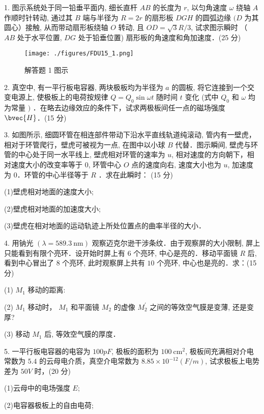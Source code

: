 
1. 图示系统处于同一铅垂平面内, 细长直杆 $A B$ 的长度为 $r$, 以匀角速度 $\omega$ 绕轴 $A$ 作顺时针转动, 通过其 $B$ 端与半径为 $R=2 r$ 的扇形板 $D G H$ 的圆弧边缘 $(D$ 为其圆心）接触, 从而带动扇形板绕轴 $O$ 转动, 且 $O D=\sqrt{3} R / 3$, 试求图示瞬时 （ $A B$ 处于水平位置, $D G$ 处于铅垂位置) 扇形板的角速度和角加速度．(25 分)

\begin{figure}[ht]
\centering
\texttt{[image: ./figures/FDU15\_1.png]}
\caption{解答题 1 图示} \label{FDU15_fig1}
\end{figure}

2. 真空中, 有一平行板电容器, 两块极板均为半径为 $a$ 的圆板, 将它连接到一个交变电源上, 使极板上的电荷按规律 $Q=Q_{0} \sin \omega t$ 随时间 $t$ 变化 (式中 $Q_{0}$ 和 $\omega$ 均为常量 $)$ ．在略去边缘效应的条件下，试求两极板间任一点的磁场强度 $\bvec{H}$．(15 分)

3. 如图所示, 细圆环管在相连部件带动下沿水平直线轨道纯滚动, 管内有一壁虎，相对于环管爬行，壁虎可被视为一点, 在图中以小球 $B$ 代替．图示瞬间, 壁虎与环管的中心处于同一水平线上, 壁虎相对环管的速率为 $u$, 相对速度的方向朝下，相对速度大小的改变率等于 $0$, 环管中心 $O$ 点的速度向右, 速度大小也为 $u$, 加速度为 $0$．环管的中心半径等于 $R$ ．求在此瞬时：
(15 分)

(1)壁虎相对地面的速度大小;

(2)壁虎相对地面的加速度大小;

(3)壁虎在相对地面的运动轨迹上所处位置点的曲率半径的大小．

4. 用钠光 $(\lambda=589.3 \mathrm{~nm})$ 观察迈克尔逊干涉条纹．由于观察屏的大小限制, 屏上只能看到有限个亮环．设开始时屏上有 $6$ 个亮环, 中心是亮的．移动平面镜 $R$ 后, 看到中心冒出了 $8$ 个亮环, 此时观察屏上共有 $10$ 个亮环, 中心也是亮的．求：(15 分)

(1) $M_{1}$ 移动的距离:

(2) $M_{1}$ 移动时， $M_{1}$ 和平面镜 $M_{2}$ 的虚像 $M_{2}^{\prime}$ 之间的等效空气膜是变薄, 还是变厚?

(3) 移动 $M_{1}$ 后, 等效空气膜的厚度．

5. 一平行板电容器的电容为 $100 p F$, 极板的面积为 $100 \mathrm{~cm}^{2}$, 极板间充满相对介电常数为 $5.4$ 的云母电介质，真空介电常数为 $8.85 \times 10^{-12}(F / m)$, 试求极板上电势差为 $50 V$ 时，(20 分)

(1)云母中的电场强度 $E$;

(2)电容器极板上的自由电荷;

